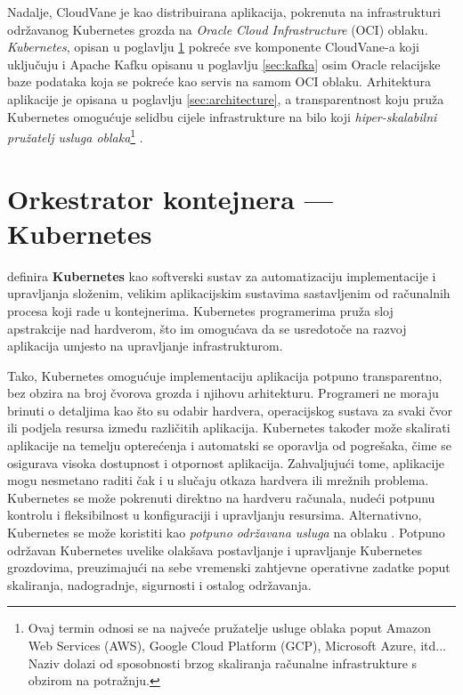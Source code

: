 \documentclass[times, utf8, diplomski]{fer}
\begin{document}
Nadalje, CloudVane je kao distribuirana aplikacija, pokrenuta na infrastrukturi održavanog Kubernetes grozda  na \emph{Oracle Cloud Infrastructure} (OCI) oblaku. \emph{Kubernetes}, opisan u poglavlju \ref{sec:k8s} pokreće sve komponente CloudVane-a koji uključuju i Apache Kafku opisanu u poglavlju \ref{sec:kafka} osim Oracle relacijske baze podataka koja se pokreće kao servis na samom OCI oblaku. Arhitektura aplikacije je opisana u poglavlju \ref{sec:architecture}, a transparentnost koju pruža Kubernetes omogućuje selidbu cijele infrastrukture na bilo koji \emph{hiper-skalabilni pružatelj usluga oblaka}\footnote{Ovaj termin odnosi se na najveće pružatelje usluge oblaka poput Amazon Web Services (AWS), Google Cloud Platform (GCP), Microsoft Azure, itd... Naziv dolazi od sposobnosti brzog skaliranja računalne infrastrukture s obzirom na potražnju.} .

\clearpage
\section{Orkestrator kontejnera --- Kubernetes}
\label{sec:k8s}

\citet{luksa_kubernetes_2023} definira \textbf{Kubernetes} kao softverski sustav za automatizaciju implementacije  i upravljanja složenim, velikim aplikacijskim sustavima sastavljenim od računalnih procesa koji rade u kontejnerima.
Kubernetes programerima pruža sloj apstrakcije nad hardverom, što im omogućava da se usredotoče na razvoj aplikacija umjesto na upravljanje infrastrukturom.

Tako, Kubernetes omogućuje implementaciju aplikacija potpuno transparentno, bez obzira na broj čvorova grozda i njihovu arhitekturu. Programeri ne moraju brinuti o detaljima kao što su odabir hardvera, operacijskog sustava za svaki čvor ili podjela resursa između različitih aplikacija. Kubernetes također može skalirati aplikacije na temelju opterećenja i automatski se oporavlja od pogrešaka, čime se osigurava visoka dostupnost i otpornost aplikacija. Zahvaljujući tome, aplikacije mogu nesmetano raditi čak i u slučaju otkaza hardvera ili mrežnih problema.\\

Kubernetes se može pokrenuti direktno na hardveru računala, nudeći potpunu kontrolu i fleksibilnost u konfiguraciji i upravljanju resursima. Alternativno, Kubernetes se može koristiti kao \emph{potpuno održavana usluga}  na oblaku . Potpuno održavan Kubernetes uvelike olakšava postavljanje i upravljanje Kubernetes grozdovima, preuzimajući na sebe vremenski zahtjevne operativne zadatke poput skaliranja, nadogradnje, sigurnosti i ostalog održavanja.
\end{document}
